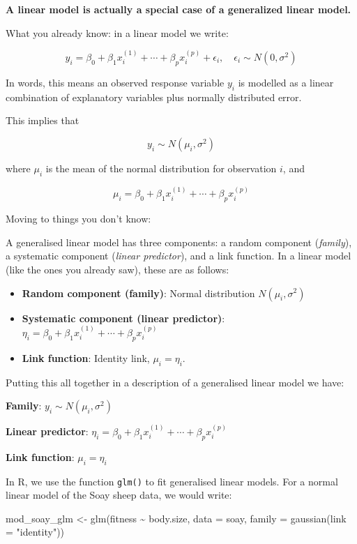 \documentclass[
  letterpaper,
  8pt,
  a4paper]{book}
\newenvironment{Shaded}{\begin{snugshade}}{\end{snugshade}}
\newcommand{\AttributeTok}[1]{\textcolor[rgb]{0.40,0.45,0.13}{#1}}
\newcommand{\FunctionTok}[1]{\textcolor[rgb]{0.28,0.35,0.67}{#1}}
\newcommand{\NormalTok}[1]{\textcolor[rgb]{0.00,0.23,0.31}{#1}}
\newcommand{\OtherTok}[1]{\textcolor[rgb]{0.00,0.23,0.31}{#1}}
\newcommand{\SpecialCharTok}[1]{\textcolor[rgb]{0.37,0.37,0.37}{#1}}
\newcommand{\StringTok}[1]{\textcolor[rgb]{0.13,0.47,0.30}{#1}}
\providecommand{\tightlist}{%
  \setlength{\itemsep}{0pt}\setlength{\parskip}{0pt}}
\begin{document}

\textbf{A linear model is actually a special case of a generalized
linear model.}

What you already know: in a linear model we write:

\[y_i = \beta_0 + \beta_1 x_i^{(1)} + \cdots + \beta_p x_i^{(p)} + \epsilon_i, \quad \epsilon_i \sim N(0, \sigma^2)\]

In words, this means an observed response variable \(y_i\) is modelled
as a linear combination of explanatory variables plus normally
distributed error.

This implies that

\[y_i \sim N(\mu_i, \sigma^2)\]

where \(\mu_i\) is the mean of the normal distribution for observation
\(i\), and

\[\mu_i = \beta_0 + \beta_1 x_i^{(1)} + \cdots + \beta_p x_i^{(p)}\]

Moving to things you don't know:

A generalised linear model has three components: a random component
(\emph{family}), a systematic component (\emph{linear predictor}), and a
link function. In a linear model (like the ones you already saw), these
are as follows:

\begin{itemize}
\tightlist
\item
  \textbf{Random component (family)}: Normal distribution
  \(N(\mu_i, \sigma^2)\)
\item
  \textbf{Systematic component (linear predictor)}:
  \(\eta_i = \beta_0 + \beta_1 x_i^{(1)} + \cdots + \beta_p x_i^{(p)}\)
\item
  \textbf{Link function}: Identity link, \(\mu_i = \eta_i\).
\end{itemize}

Putting this all together in a description of a generalised linear model
we have:

\textbf{Family}: \(y_i \sim N(\mu_i, \sigma^2)\)

\textbf{Linear predictor}:
\(\eta_i = \beta_0 + \beta_1 x_i^{(1)} + \cdots + \beta_p x_i^{(p)}\)

\textbf{Link function}: \(\mu_i = \eta_i\)

In R, we use the function \texttt{glm()} to fit generalised linear
models. For a normal linear model of the Soay sheep data, we would
write:

\begin{Shaded}
\begin{Highlighting}[]
\NormalTok{mod\_soay\_glm }\OtherTok{\textless{}{-}} \FunctionTok{glm}\NormalTok{(fitness }\SpecialCharTok{\textasciitilde{}}\NormalTok{ body.size, }\AttributeTok{data =}\NormalTok{ soay, }\AttributeTok{family =} \FunctionTok{gaussian}\NormalTok{(}\AttributeTok{link =} \StringTok{"identity"}\NormalTok{))}
\end{Highlighting}
\end{Shaded}
\end{document}
